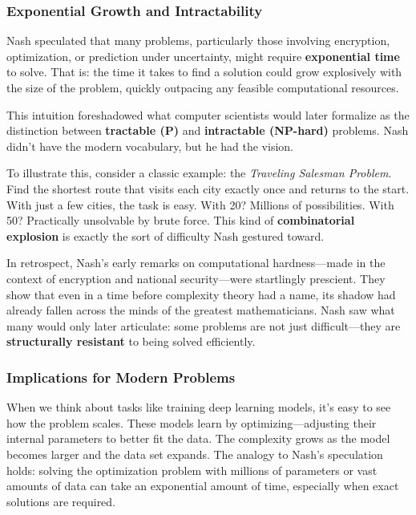 \subsubsection{Exponential Growth and Intractability}

Nash speculated that many problems, particularly those involving encryption, optimization, or prediction under uncertainty, might require \textbf{exponential time} to solve. That is: the time it takes to find a solution could grow explosively with the size of the problem, quickly outpacing any feasible computational resources.

This intuition foreshadowed what computer scientists would later formalize as the distinction between \textbf{tractable (P)} and \textbf{intractable (NP-hard)} problems. Nash didn’t have the modern vocabulary, but he had the vision.

To illustrate this, consider a classic example: the \textit{Traveling Salesman Problem}. Find the shortest route that visits each city exactly once and returns to the start. With just a few cities, the task is easy. With 20? Millions of possibilities. With 50? Practically unsolvable by brute force. This kind of \textbf{combinatorial explosion} is exactly the sort of difficulty Nash gestured toward.

\medskip

In retrospect, Nash’s early remarks on computational hardness—made in the context of encryption and national security—were startlingly prescient. They show that even in a time before complexity theory had a name, its shadow had already fallen across the minds of the greatest mathematicians. Nash saw what many would only later articulate: some problems are not just difficult—they are \textbf{structurally resistant} to being solved efficiently.


\subsubsection{Implications for Modern Problems}

When we think about tasks like training deep learning models, it’s easy to see how the problem scales. These models learn by optimizing—adjusting their internal parameters to better fit the data. The complexity grows as the model becomes larger and the data set expands. The analogy to Nash’s speculation holds: solving the optimization problem with millions of parameters or vast amounts of data can take an exponential amount of time, especially when exact solutions are required.


